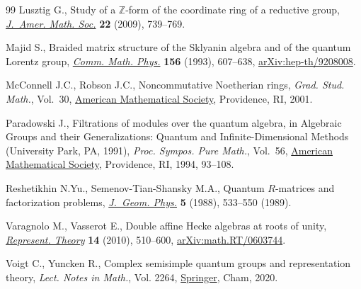 \documentclass[11pt]{article}
\numberwithin{equation}{section}
\numberwithin{equation}{section}
\theoremstyle{definition}
\begin{document}
\begin{thebibliography}{99}
Lusztig G., Study of a $\mathbb{Z}$-form of the coordinate ring of a reductive
 group, \href{https://doi.org/10.1090/S0894-0347-08-00603-6}{\textit{J.~Amer. Math. Soc.}} \textbf{22} (2009), 739--769.

Majid S., Braided matrix structure of the {S}klyanin algebra and of the quantum
 {L}orentz group, \href{https://doi.org/10.1007/BF02096865}{\textit{Comm. Math. Phys.}} \textbf{156} (1993), 607--638,
 \href{https://arxiv.org/abs/hep-th/9208008}{arXiv:hep-th/9208008}.

McConnell J.C., Robson J.C., Noncommutative {N}oetherian rings, \textit{Grad.
 Stud. Math.}, Vol.~30, \href{https://doi.org/10.1090/gsm/030}{American Mathematical Society}, Providence, RI, 2001.

Paradowski J., Filtrations of modules over the quantum algebra, in Algebraic
 {G}roups and their {G}eneralizations: {Q}uantum and {I}nfinite-{D}imensional
 {M}ethods ({U}niversity {P}ark, {PA}, 1991), \textit{Proc. Sympos. Pure
 Math.}, Vol.~56, \href{https://doi.org/10.1090/pspum/056.2/1278729}{American Mathematical Society}, Providence, RI, 1994,
 93--108.

Reshetikhin N.Yu., Semenov-Tian-Shansky M.A., Quantum {$R$}-matrices and
 factorization problems, \href{https://doi.org/10.1016/0393-0440(88)90018-6}{\textit{J.~Geom. Phys.}} \textbf{5} (1988), 533--550
 (1989).

Varagnolo M., Vasserot E., Double affine {H}ecke algebras at roots of unity,
 \href{https://doi.org/10.1090/S1088-4165-2010-00384-2}{\textit{Represent. Theory}} \textbf{14} (2010), 510--600,
 \href{https://arxiv.org/abs/math.RT/0603744}{arXiv:math.RT/0603744}.

Voigt C., Yuncken R., Complex semisimple quantum groups and representation
 theory, \textit{Lect. Notes in Math.}, Vol. 2264, \href{https://doi.org/10.1007/978-3-030-52463-0}{Springer}, Cham, 2020.

\end{thebibliography}
\end{document}
